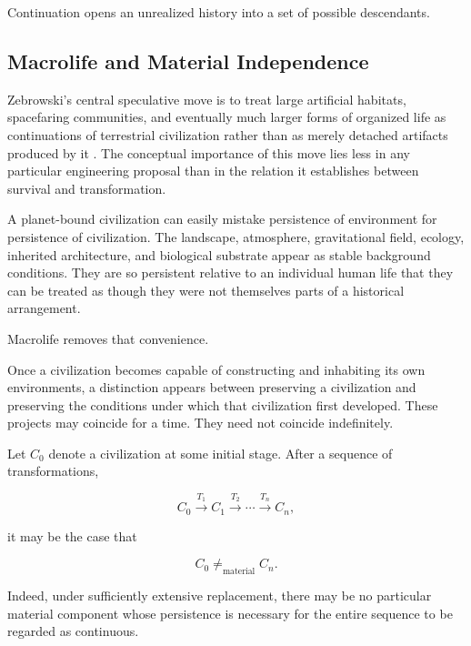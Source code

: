 \documentclass[
  11pt,
  a4paper,
  DIV=12,
  BCOR=0mm,
  parskip=half-
]{scrartcl}
\theoremstyle{definition}
\theoremstyle{plain}
\theoremstyle{remark}
\begin{document}
Continuation opens an unrealized history into a set of possible descendants.


\subsection{Macrolife and Material Independence}
\label{sec:macrolife-material}

Zebrowski's central speculative move is to treat large artificial habitats,
spacefaring communities, and eventually much larger forms of organized life
as continuations of terrestrial civilization rather than as merely detached
artifacts produced by it \cite{zebrowski1979}. The conceptual importance of
this move lies less in any particular engineering proposal than in the
relation it establishes between survival and transformation.

A planet-bound civilization can easily mistake persistence of environment for
persistence of civilization. The landscape, atmosphere, gravitational field,
ecology, inherited architecture, and biological substrate appear as stable
background conditions. They are so persistent relative to an individual
human life that they can be treated as though they were not themselves parts
of a historical arrangement.

Macrolife removes that convenience.

Once a civilization becomes capable of constructing and inhabiting its own
environments, a distinction appears between preserving a civilization and
preserving the conditions under which that civilization first developed.
These projects may coincide for a time. They need not coincide indefinitely.

Let \(C_0\) denote a civilization at some initial stage. After a sequence of
transformations,

\[
  C_0
  \xrightarrow{T_1}
  C_1
  \xrightarrow{T_2}
  \cdots
  \xrightarrow{T_n}
  C_n,
\]

it may be the case that

\[
  C_0\neq_{\mathrm{material}}C_n.
\]

Indeed, under sufficiently extensive replacement, there may be no particular
material component whose persistence is necessary for the entire sequence to
be regarded as continuous.
\end{document}
